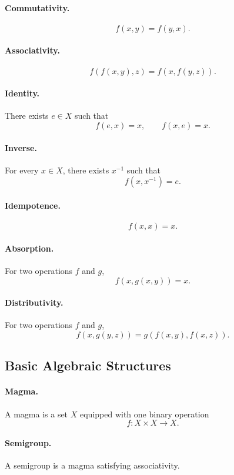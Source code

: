 \documentclass[11pt]{article}
\begin{document}
\paragraph{Commutativity.}
\[
  f(x,y) = f(y,x).
\]

\paragraph{Associativity.}
\[
  f(f(x,y),z) = f(x,f(y,z)).
\]

\paragraph{Identity.}
There exists \(e \in X\) such that
\[
  f(e,x) = x,
  \qquad
  f(x,e) = x.
\]

\paragraph{Inverse.}
For every \(x \in X\), there exists \(x^{-1}\) such that
\[
  f(x,x^{-1}) = e.
\]

\paragraph{Idempotence.}
\[
  f(x,x) = x.
\]

\paragraph{Absorption.}
For two operations \(f\) and \(g\),
\[
  f(x,g(x,y)) = x.
\]

\paragraph{Distributivity.}
For two operations \(f\) and \(g\),
\[
  f(x,g(y,z)) = g(f(x,y),f(x,z)).
\]

\subsection{Basic Algebraic Structures}

\paragraph{Magma.}
A magma is a set \(X\) equipped with one binary operation
\[
  f : X \times X \to X.
\]

\paragraph{Semigroup.}
A semigroup is a magma satisfying associativity.
\end{document}

